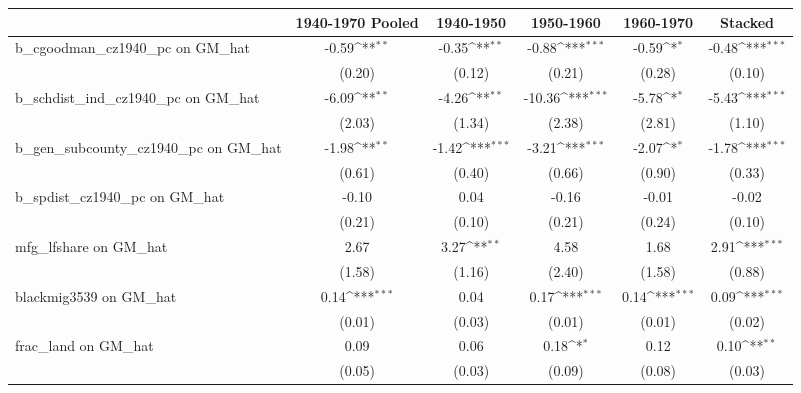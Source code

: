 {
\def\sym#1{\ifmmode^{#1}\else\(^{#1}\)\fi}
\begin{tabular}{l*{5}{c}}
\toprule
                &\multicolumn{1}{c}{1940-1970 Pooled}&\multicolumn{1}{c}{1940-1950}&\multicolumn{1}{c}{1950-1960}&\multicolumn{1}{c}{1960-1970}&\multicolumn{1}{c}{Stacked}\\
\midrule
b\_cgoodman\_cz1940\_pc on GM\_hat&    -0.59\sym{**} &    -0.35\sym{**} &    -0.88\sym{***}&    -0.59\sym{*}  &    -0.48\sym{***}\\
                &   (0.20)         &   (0.12)         &   (0.21)         &   (0.28)         &   (0.10)         \\
\addlinespace
b\_schdist\_ind\_cz1940\_pc on GM\_hat&    -6.09\sym{**} &    -4.26\sym{**} &   -10.36\sym{***}&    -5.78\sym{*}  &    -5.43\sym{***}\\
                &   (2.03)         &   (1.34)         &   (2.38)         &   (2.81)         &   (1.10)         \\
\addlinespace
b\_gen\_subcounty\_cz1940\_pc on GM\_hat&    -1.98\sym{**} &    -1.42\sym{***}&    -3.21\sym{***}&    -2.07\sym{*}  &    -1.78\sym{***}\\
                &   (0.61)         &   (0.40)         &   (0.66)         &   (0.90)         &   (0.33)         \\
\addlinespace
b\_spdist\_cz1940\_pc on GM\_hat&    -0.10         &     0.04         &    -0.16         &    -0.01         &    -0.02         \\
                &   (0.21)         &   (0.10)         &   (0.21)         &   (0.24)         &   (0.10)         \\
\addlinespace
mfg\_lfshare on GM\_hat&     2.67         &     3.27\sym{**} &     4.58         &     1.68         &     2.91\sym{***}\\
                &   (1.58)         &   (1.16)         &   (2.40)         &   (1.58)         &   (0.88)         \\
\addlinespace
blackmig3539 on GM\_hat&     0.14\sym{***}&     0.04         &     0.17\sym{***}&     0.14\sym{***}&     0.09\sym{***}\\
                &   (0.01)         &   (0.03)         &   (0.01)         &   (0.01)         &   (0.02)         \\
\addlinespace
frac\_land on GM\_hat&     0.09         &     0.06         &     0.18\sym{*}  &     0.12         &     0.10\sym{**} \\
                &   (0.05)         &   (0.03)         &   (0.09)         &   (0.08)         &   (0.03)         \\

\end{tabular}}

